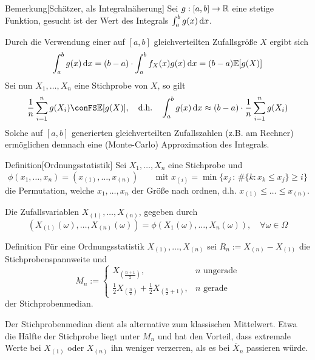 \begin{colbox}{Bemerkung}[Schätzer, als Integralnäherung]
    Sei $g:[a,b]\to\mathbb R$ eine stetige Funktion, gesucht ist der Wert des Integrals $\int_{a}^{b} g(x)\mathop{}\!\mathrm{d} x$.

    Durch die Verwendung einer auf $[a,b]$ gleichverteilten Zufallsgröße $X$ ergibt sich 
    \[
        \int_{a}^{b} g(x)\mathop{}\!\mathrm{d} x = (b-a)\cdot\int_{a}^{b}f_X(x)g(x)\mathop{}\!\mathrm{d} x = (b-a)\mathbb E[g(X)]
    \]
    Sei nun $X_1,\dots,X_n$ eine Stichprobe von $X$, so gilt 
    \[
        \dfrac{1}{n}\sum_{i=1}^{n} g(X_i) \conFS \E[g(X)],
        \quad \text{d.h.}\quad
        \int_{a}^{b} g(x)\diff x \approx (b-a)\cdot \dfrac{1}{n}\sum_{i=1}^{n} g(X_i)
    \]
    Solche auf $[a,b]$ generierten gleichverteilten Zufallszahlen (z.B. am Rechner) 
    ermöglichen demnach eine (Monte-Carlo) Approximation des Integrals.
\end{colbox}

\begin{colbox}{Definition}[Ordnungsstatistik]
    Sei $X_1,\dots,X_n$ eine Stichprobe und 
    \[
        \phi(x_1,\dots,x_n) = (x_{(1)}, \dots,x_{(n)}) 
        \qquad \text{mit } x_{(i)} = \min\big\{x_j\,:\,\#\{k:x_k\leq x_j\} \geq i\big\}
    \]
    die Permutation, welche $x_1,\dots,x_n$ der Größe nach ordnen, d.h. $x_{(1)}\leq\dots\leq x_{(n)}$.

    Die Zufallsvariablen $X_{(1)},\dots,X_{(n)}$, gegeben durch 
    \[
        (X_{(1)}(\omega),\dots,X_{(n)}(\omega)) = \phi(X_1(\omega),\dots,X_n(\omega)), \quad\forall\omega\in\Omega
    \]
\end{colbox}

\begin{colbox}{Definition}
    Für eine Ordnungsstatistik $X_{(1)},\dots,X_{(n)}$ sei $R_n := X_{(n)}-X_{(1)}$ die Stichprobenspannweite und 
    \[
        M_n := \begin{cases}
            X_{(\tfrac{n+1}{2})}, & n \text{ ungerade} \\
            \tfrac{1}{2}X_{(\tfrac{n}{2})}+\tfrac{1}{2}X_{(\tfrac{n}{2}+1)}, & n \text{ gerade}
        \end{cases}
    \]
    der Stichprobenmedian.
\end{colbox}

Der Stichprobenmedian dient als alternative zum klassischen Mittelwert. Etwa die Hälfte der Stichprobe liegt unter 
$M_n$ und hat den Vorteil, dass extremale Werte bei $X_{(1)}$ oder $X_{(n)}$ ihn weniger verzerren, als es 
bei $\overline{X}_n$ passieren würde.


